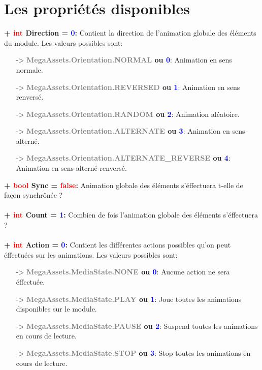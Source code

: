\documentclass[a4paper, 11pt]{article}
\begin{document}
	\section{Les propriétés disponibles}
	\textbf{+ \textcolor{red}{int} \hypertarget{direction}{Direction} = \textcolor{blue}{0}:} Contient la 
	direction de l'animation globale des éléments du module. Les valeurs possibles sont:
	\begin{itemize}
		\item[-> \textbf{\textcolor{gray}{MegaAssets.Orientation.NORMAL} ou \textcolor{blue}{0}}:] Animation 
		en sens normale.
		\item[-> \textbf{\textcolor{gray}{MegaAssets.Orientation.REVERSED} ou \textcolor{blue}{1}}:]
		Animation en sens renversé.
		\item[-> \textbf{\textcolor{gray}{MegaAssets.Orientation.RANDOM} ou \textcolor{blue}{2}}:] Animation 
		aléatoire.
		\item[-> \textbf{\textcolor{gray}{MegaAssets.Orientation.ALTERNATE} ou \textcolor{blue}{3}}:] 
		Animation en sens alterné.
		\item[-> \textbf{\textcolor{gray}{MegaAssets.Orientation.ALTERNATE\_REVERSE} ou \textcolor{blue}
		{4}}:] Animation en sens alterné renversé.\\
	\end{itemize}
	\textbf{+ \textcolor{red}{bool} Sync = \textcolor{red}{false}:} Animation globale des éléments 
	s'éffectuera t-elle de façon synchrônée ?\\\\
	\textbf{+ \textcolor{red}{int} Count = \textcolor{blue}{1}:} Combien de fois l'animation globale des 
	éléments s'éffectuera ?\\\\
	\textbf{+ \textcolor{red}{int} Action = \textcolor{blue}{0}:} Contient les différentes actions possibles
	qu'on peut éffectuées sur les animations. Les valeurs possibles sont:
	\begin{itemize}
		\item[-> \textbf{\textcolor{gray}{MegaAssets.MediaState.NONE} ou \textcolor{blue}{0}}:] Aucune 
		action ne sera éffectuée.
		\item[-> \textbf{\textcolor{gray}{MegaAssets.MediaState.PLAY} ou \textcolor{blue}{1}}:] Joue toutes
		les animations disponibles sur le module.
		\item[-> \textbf{\textcolor{gray}{MegaAssets.MediaState.PAUSE} ou \textcolor{blue}{2}}:] Suspend 
		toutes les animations en cours de lecture.
		\item[-> \textbf{\textcolor{gray}{MegaAssets.MediaState.STOP} ou \textcolor{blue}{3}}:] Stop toutes 
		les animations en cours de lecture.\\
	\end{itemize}
\end{document}
